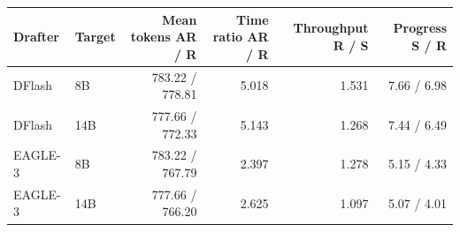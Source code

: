 \begin{tabular}{llrrrr}
\toprule
Drafter & Target & Mean tokens AR / R & Time ratio AR / R & Throughput R / S & Progress S / R \\
\midrule
DFlash & 8B & 783.22 / 778.81 & 5.018 & 1.531 & 7.66 / 6.98 \\
DFlash & 14B & 777.66 / 772.33 & 5.143 & 1.268 & 7.44 / 6.49 \\
EAGLE-3 & 8B & 783.22 / 767.79 & 2.397 & 1.278 & 5.15 / 4.33 \\
EAGLE-3 & 14B & 777.66 / 766.20 & 2.625 & 1.097 & 5.07 / 4.01 \\
\bottomrule
\end{tabular}
